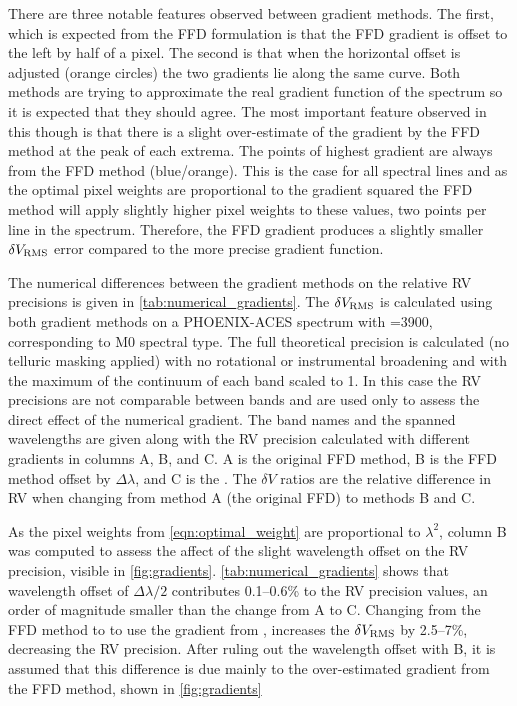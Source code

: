 There are three notable features observed between gradient methods.
The first, which is expected from the {FFD} formulation is that the {FFD} gradient is offset to the left by half of a pixel.
The second is that when the horizontal offset is adjusted (orange circles) the two gradients lie along the same curve.
Both methods are trying to approximate the real gradient function of the spectrum so it is expected that they should agree.
The most important feature observed in this though is that there is a slight over-estimate of the gradient by the {FFD} method at the peak of each extrema.
The points of highest gradient are always from the {FFD} method (blue/orange).
This is the case for all spectral lines and as the optimal pixel weights are proportional to the gradient squared the {FFD} method will apply slightly higher pixel weights to these values, two points per line in the spectrum.
Therefore, the {FFD} gradient produces a slightly smaller \(\delta V_{\textrm{RMS}}\) error compared to the more precise gradient function.

The numerical differences between the gradient methods on the relative {RV} precisions is given in \cref{tab:numerical_gradients}.
The \(\delta V_{\textrm{RMS}}\) is calculated using both gradient methods on a {PHOENIX-ACES} spectrum with \Teff{}=3900\K{}, corresponding to {{M0}} spectral type.
The full theoretical precision is calculated (no telluric masking applied) with no rotational or instrumental broadening and with the maximum of the continuum of each band scaled to 1.
In this case the {RV} precisions are not comparable between bands and are used only to assess the direct effect of the numerical gradient.
The band names and the spanned wavelengths are given along with the {RV} precision calculated with different gradients in columns A, B, and C.
A is the original {FFD} method, B is the {FFD} method offset by \(\Delta\lambda\), and C is the \npgradient{}.
The \(\delta V\) ratios are the relative difference in {RV} when changing from method A (the original {FFD}) to methods B and C.

As the pixel weights from \cref{eqn:optimal_weight} are proportional to \({\lambda}^{2}\), column B was computed to assess the affect of the slight wavelength offset on the {RV} precision, visible in \cref{fig:gradients}.
\cref{tab:numerical_gradients} shows that wavelength offset of \(\Delta\lambda/2\) contributes 0.1--0.6\% to the {RV} precision values, an order of magnitude smaller than the change from A to C.
Changing from the {FFD} method to \npgradient{} to use the gradient from \numpy{}, increases the \(\delta V_{\textrm{RMS}}\) by 2.5--7\%, decreasing the {RV} precision.
After ruling out the wavelength offset with B, it is assumed that this difference is due mainly to the over-estimated gradient from the {FFD} method, shown in \cref{fig:gradients}

